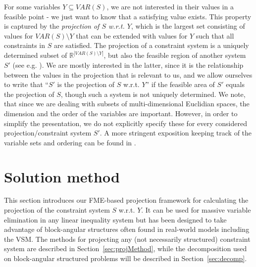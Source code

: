 \documentclass{llncs}
\newcommand{\VAR}{\mathit{VAR}}
\begin{document}
For some variables $Y\subseteq \VAR(S)$, we are not interested in their values in a feasible point - we just want to know that a satisfying value exists. This property is captured by the \emph{projection of $S$ w.r.t. $Y$}, which is the largest set consisting of values for $\VAR(S)\setminus Y$ that can be extended with values for $Y$ such that all constraints in $S$ are satisfied. 
%
The projection of a constraint system is a uniquely determined subset of $\mathbb{R}^{|\VAR(S)\setminus Y|}$, but also the feasible region of another system $S'$ (see e.g. \cite{ziegler95}). We are mostly interested in the latter, since it is the relationship between the values in the projection that is relevant to us, and we allow ourselves to write that ``$S'$ is the projection of $S$ w.r.t. $Y$'' if the feasible area of $S'$ equals the projection of $S$, though such a system is not uniquely determined.
We note, that since we are dealing with subsets of multi-dimensional Euclidian spaces, the dimension and the order of the variables are important. However, in order to simplify the presentation, we do not explicitly specify these for every considered projection/constraint system $S'$. A more stringent exposition keeping track of the variable sets and ordering can be found in \cite{MyTechRep}.
\section{Solution method} \label{sec:method}
This section introduces our FME-based projection framework for calculating the projection of the constraint system $S$ w.r.t. $Y$. It can be used for massive variable elimination in any linear inequality system but has been designed to take advantage of block-angular structures often found in real-world models including the VSM. 
The methods for projecting any (not necessarily structured) constraint system are described in Section~\ref{sec:projMethod}, while the decomposition used on block-angular structured problems will be described in Section~\ref{sec:decomp}.
\end{document}
